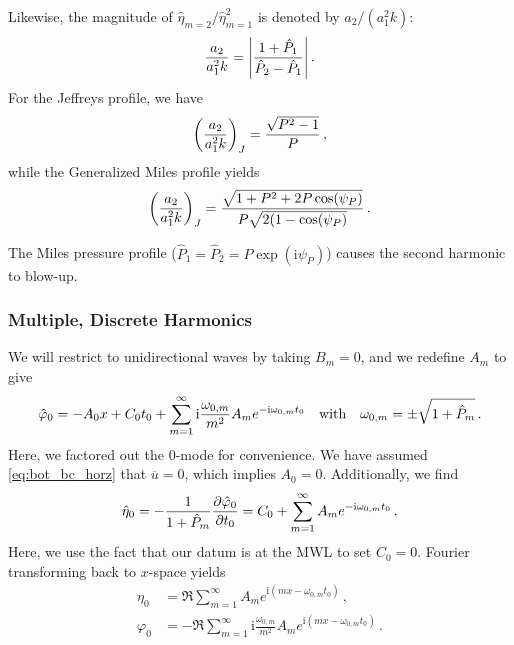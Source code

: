 \documentclass{jfm}
\let\Oldsubsubsection\subsubsection
\renewcommand{\subsubsection}{\FloatBarrier\Oldsubsubsection}
\newcommand{\GenP}{\hat{P}_m}
\newcommand{\POne}{\hat{P}_1}
\newcommand{\PTwo}{\hat{P}_2}
\newcommand{\im}{\mathrm{i}}
\begin{document}
Likewise, the magnitude of $\hat{\eta}_{m=2}/\hat{\eta}_{m=1}^2$ is
denoted by $a_2/(a_1^2 k)$:
\begin{equation}
  \frac{a_2}{a_1^2 k} = \abs{\frac{1 + \POne}{\PTwo - \POne}} \,.
\end{equation}
For the Jeffreys profile, we have
\begin{equation}
  \pqty{\frac{a_2}{a_1^2 k}}_J = \frac{\sqrt{P^2-1}}{P} \,,
\end{equation}
while the Generalized Miles profile yields
\begin{equation}
  \pqty{\frac{a_2}{a_1^2 k}}_J = \frac{\sqrt{1 + P^2 + 2 P
    \cos(\psi_P)}}{P \sqrt{2(1-\cos(\psi_P)}} \,.
\end{equation}

The Miles pressure profile ($\POne = \PTwo = P \exp(\im \psi_P)$) causes
the second harmonic to blow-up.

\subsubsection{\label{sec:strong_discrete_multiple} Multiple, Discrete Harmonics}
We will restrict to unidirectional waves by taking $B_m = 0$, and we
redefine $A_m$ to give
\begin{equation}
  \hat{\varphi}_0 = - A_0 x + C_0 t_0 + \sum_{m=1}^{\infty} \im
    \frac{\omega_{0,m}}{m^2} A_m e^{-\im \omega_{0,m} t_0}
  \qq{with} \omega_{0,m} = \pm \sqrt{1+\GenP} \,.
\end{equation}
Here, we factored out the $0$-mode for convenience.
We have assumed \cref{eq:bot_bc_horz} that $\overline{u} = 0$,
which implies $A_0 = 0$.
Additionally, we find
\begin{equation}
  \hat{\eta}_0 = - \frac{1}{1+\GenP} \pdv{\hat{\varphi}_0}{t_0} =
    C_0 +
    \sum_{m=1}^{\infty} A_m e^{-\im \omega_{0,m} t_0} \,.
\end{equation}
Here, we use the fact that our datum is at the MWL to set $C_0 = 0$.
Fourier transforming back to $x$-space yields
\begin{align}
  \eta_0 &= \Re \sum_{m=1}^{\infty} A_m
    e^{\im (m x-\omega_{0,m} t_0)} \,, \\
  \varphi_0 &= -\Re \sum_{m=1}^{\infty} \im \frac{\omega_{0,m}}{m^2} A_m
    e^{\im (m x-\omega_{0,m} t_0)} \,.
\end{align}
\end{document}
